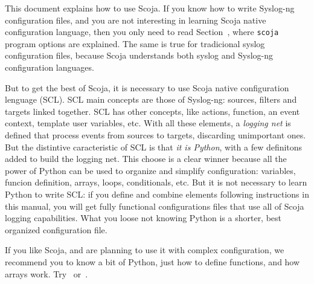
This document explains how to use Scoja.
If you know how to write Syslog-ng configuration files, and you are
not interesting in learning Scoja native configuration language, then
you only need to read Section~\label{conf}, where {\tt scoja} program
options are explained.
The same is true for tradicional syslog configuration files,
because Scoja understands both syslog and Syslog-ng configuration
languages.

But to get the best of Scoja, it is necessary to use Scoja native
configuration lenguage (SCL).
SCL main concepts are those of Syslog-ng:
sources, filters and targets linked together.
SCL has other concepts,
like actions, function, an event context, template user variables,
etc.
With all these elements, a \emph{logging net} is defined that process
events from sources to targets, discarding unimportant ones.
But the distintive caracteristic of SCL is that \emph{it is Python},
with a few definitons added to build the logging net.
This choose is a clear winner because all the power of Python can be
used to organize and simplify configuration:
  variables, funcion definition, arrays, loops, conditionals, etc.
But it is not necessary to learn Python to write SCL:
if you define and combine elements following instructions in this
manual, you will get fully functional configurations files that use
all of Scoja logging capabilities.
What you loose not knowing Python is a shorter, best organized
configuration file.

If you like Scoja, and are planning to use it with complex
configuration, we recommend you to know a bit of Python,
just how to define functions, and how arrays work.
Try~\cite{Diving} or~\cite{Python}.
